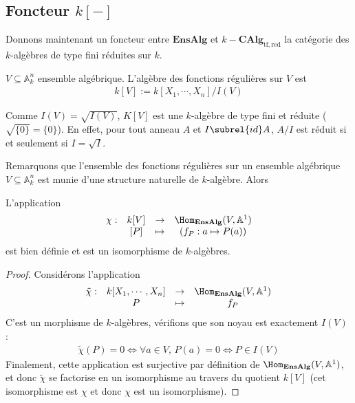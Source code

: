         \subsection{Foncteur $k[-]$}
            Donnons maintenant un foncteur entre $\mathbf{EnsAlg}$ et $k-\mathbf{CAlg}_\mathrm{tf, red}$ la catégorie des $k$-algèbres de type fini réduites sur $k$.
            \begin{defi}
                $V \subseteq \mathbb{A}_k^n$ ensemble algébrique. L'algèbre des fonctions régulières sur $V$ est
                \begin{align*}
                    k[V] := k[X_1, \cdots, X_n]/I(V)
                \end{align*}
            \end{defi}
            \begin{remq}
                Comme $I(V) = \sqrt{I(V)}$, $K[V]$ est une $k$-algèbre de type fini et réduite ($\sqrt{\{0\}} = \{0\}$). En effet, pour tout anneau $A$ et $I \subrel{id} A$, $A/I$ est réduit si et seulement si $I = \sqrt{I}$.
            \end{remq}
            Remarquons que l'ensemble des fonctions régulières sur un ensemble algébrique $V \subseteq \mathbb{A}_k^n$ est munie d'une structure naturelle de $k$-algèbre. Alors
            \begin{lemm}
                L'application
                \begin{align*}
                    \begin{array}{cccc}
                        \chi : & k[V] & \to & \Hom_{\mathbf{EnsAlg}}(V, \mathbb{A}^1) \\
                        & [P] & \mapsto & (f_P : a \mapsto P(a))\\
                    \end{array}
                \end{align*}
                est bien définie et est un isomorphisme de $k$-algèbres.
            \end{lemm}
            \begin{proof}
                Considérons l'application
                \begin{align*}
                    \begin{array}{cccc}
                        \tilde \chi : & k[X_1, \cdots, X_n] & \to & \Hom_{\mathbf{EnsAlg}}(V, \mathbb{A}^1) \\
                        & P & \mapsto & f_P\\
                    \end{array}
                \end{align*}
                C'est un morphisme de $k$-algèbres, vérifions que son noyau est exactement $I(V)$ : \begin{align*}
                    \tilde \chi (P) = 0 \iff \forall a \in V,\, P(a) = 0 \iff P \in I(V)
                \end{align*}
                Finalement, cette application est surjective par définition de $\Hom_{\mathbf{EnsAlg}}(V, \mathbb{A}^1)$, et donc $\tilde \chi$ se factorise en un isomorphisme au travers du quotient $k[V]$ (cet isomorphisme est $\chi$ et donc $\chi$ est un isomorphisme).
            \end{proof}
